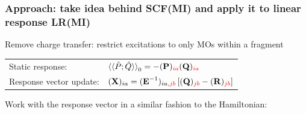 \documentclass[%
    xcolor=usenames,dvipsnames,svgnames%
]{beamer}
\begin{document}
\begin{frame}
  \frametitle{Approach: take idea behind SCF(MI) and apply it to linear response \textrightarrow{} \textcolor{AlertColor}{LR(MI)}}
  Remove charge transfer: restrict excitations to only MOs within a fragment
  \begin{table}
    \centering
    \begin{tabular}{ll}
      Static response: & \(\braket{\braket{\hat{P};\hat{Q}}}_{0} = -(\boldsymbol{\mathbf{P}})_{\textcolor{red}{ia}}(\boldsymbol{\mathbf{Q}})_{\textcolor{red}{ia}}\) \\
      Response vector update: & \((\boldsymbol{\mathbf{X}})_{ia} = (\boldsymbol{\mathbf{E}}^{-1})_{ia,\textcolor{red}{jb}} \left[ (\boldsymbol{\mathbf{Q}})_{\textcolor{red}{jb}} - (\boldsymbol{\mathbf{R}})_{\textcolor{red}{jb}} \right]\)
    \end{tabular}
  \end{table}
  Work with the response vector in a similar fashion to the Hamiltonian:
  \begin{table}
    \centering
    \begin{tabular}{ccc}

\end{tabular}
\end{table}
\end{frame}
\end{document}
